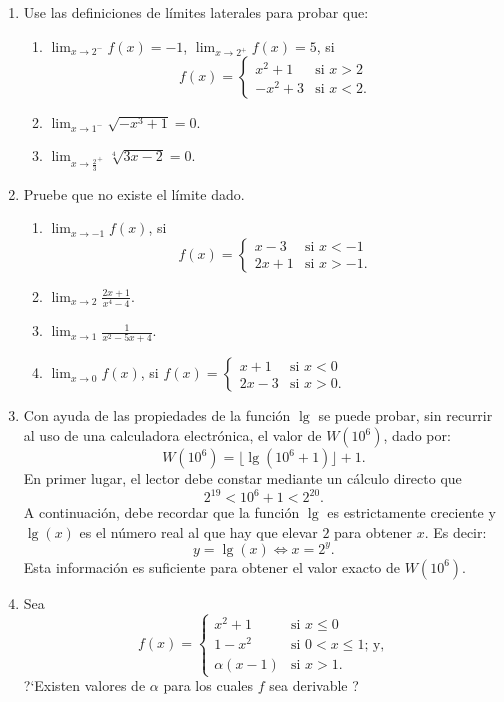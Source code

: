 \begin{multicols}{2}
\begin{enumerate}[leftmargin=*]
\begin{enumerate}
\end{enumerate}
\item Use las definiciones de límites laterales para probar que:

\begin{enumerate}
\item $\displaystyle \lim_{x\to 2^-}f(x)=-1$, $\displaystyle \lim_{x\to 2^+}f(x)=5$, si
\[
    f(x)=
\begin{cases}
x^2+1 & \text{si $x>2$}\\
-x^2+3 & \text{si $x<2$}.
\end{cases}
\]
\item $\displaystyle \lim_{x\to 1^-}\sqrt{-x^3+1}=0.$
\item $\displaystyle \lim_{x\to \frac{2}{3}^+}\sqrt[4]{3x-2}=0$.
\end{enumerate}

\item Pruebe que no existe el límite dado.

\begin{enumerate}
\item $\displaystyle \lim_{x\to -1}f(x)$, si
\[
f(x)=
\begin{cases}
x-3 & \text{si $x<-1$}\\
2x+1 & \text{si $x>-1$}.
\end{cases}
\]
\item $\displaystyle \lim_{x\to 2}\frac{2x+1}{x^4-4}$.
\item $\displaystyle \lim_{x\to 1}\frac{1}{x^2-5x+4}$.
\item $\displaystyle \lim_{x\to 0}f(x)$, si $\displaystyle f(x)=
\begin{cases}
x+1 & \text{si $x<0$}\\
2x-3& \text{si $x>0$}.
\end{cases}
$
\end{enumerate}

\item Con ayuda de las propiedades de la función $\lg$ se puede probar, sin recurrir al uso de
    una calculadora electrónica, el valor de $W(10^6)$, dado por:
    \[
      W(10^6) = \lfloor\lg(10^6  + 1)\rfloor + 1.
    \]
    En primer lugar, el lector debe constar mediante un cálculo directo que
    \[
        2^{19} < 10^6 + 1 < 2^{20}.
    \]
    A continuación, debe recordar que la función $\lg$ es estrictamente creciente y $\lg(x)$ es
    el número real al que hay que elevar $2$ para obtener $x$. Es decir:
    \[
      y = \lg(x) \Longleftrightarrow x = 2^y.
    \]
    Esta información es suficiente para obtener el valor exacto de $W(10^6)$.

\item Sea 
\[ f(x)=
\begin{cases}
x^2+1 & \text{si $x\leq 0$}\\
1-x^2 & \text{si $0<x\leq 1$; y,}\\
\alpha (x-1) & \text{si $x>1$.}
\end{cases}
\]
?`Existen valores de $\alpha$ para los cuales $f$ sea derivable ?
\end{enumerate}
\end{multicols}
\endgroup

